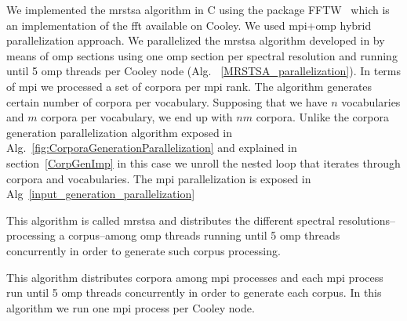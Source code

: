 \documentclass[10pt,journal,compsoc]{IEEEtran}
\begin{document}
We implemented the \gls{mrstsa} algorithm in C using the package FFTW~\cite{fftw} which is an implementation of the \gls{fft} available on Cooley. We used \gls{mpi}+\gls{omp} hybrid parallelization approach. We parallelized the \gls{mrstsa} algorithm developed in \cite{Dematties2018} by means of \gls{omp} sections using one \gls{omp} section per spectral resolution and running until 5 \gls{omp} threads per Cooley node (Alg. ~\ref{MRSTSA_parallelization}). In terms of \gls{mpi} we processed a set of corpora per \gls{mpi} rank. The algorithm generates certain number of corpora per vocabulary. Supposing that we have $n$ vocabularies and $m$ corpora per vocabulary, we end up with $n m$ corpora. Unlike the corpora generation parallelization algorithm exposed in Alg.~\ref{fig:CorporaGenerationParallelization} and explained in section~\ref{CorpGenImp} in this case we unroll the nested loop that iterates through corpora and vocabularies. The \gls{mpi} parallelization is exposed in Alg~\ref{input_generation_parallelization}

\begin{algorithm}
	\caption{This algorithm is called \gls{mrstsa} and distributes the different spectral resolutions--processing a corpus--among \gls{omp} threads running until 5 \gls{omp} threads concurrently in order to generate such corpus processing.}
\label{MRSTSA_parallelization}
\begin{algorithmic}[1]
\end{algorithmic}
\end{algorithm}

\begin{algorithm}
	\caption{This algorithm distributes corpora among \gls{mpi} processes and each \gls{mpi} process run until 5 \gls{omp} threads concurrently in order to generate each corpus. In this algorithm we run one \gls{mpi} process per Cooley node.}
\label{input_generation_parallelization}
\begin{algorithmic}[1]
	\ENDFOR
\end{algorithmic}
\end{algorithm}
\end{document}

